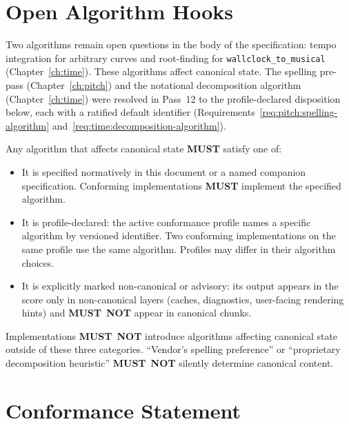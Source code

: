 \documentclass[11pt,letterpaper]{report}
\newcounter{requirement}[chapter]
\newcommand{\MUST}{\textbf{MUST}}
\newcommand{\MUSTNOT}{\textbf{MUST}\nobreak\ \textbf{NOT}}
\begin{document}
\section{Open Algorithm Hooks}
\label{sec:det:open}

Two algorithms remain open questions in the body of the
specification: tempo integration for arbitrary curves
and root-finding for \texttt{wallclock\_to\_musical}
(Chapter~\ref{ch:time}). These algorithms affect canonical
state. The spelling pre-pass (Chapter~\ref{ch:pitch}) and the
notational decomposition algorithm (Chapter~\ref{ch:time})
were resolved in Pass~12 to the profile-declared disposition
below, each with a ratified default identifier
(Requirements~\ref{req:pitch:spelling-algorithm}
and~\ref{req:time:decomposition-algorithm}).

\begin{requirement}
  \label{req:determinism:canonical-algorithm-registration}
  Any algorithm that affects canonical state \MUST{} satisfy one
  of:

  \begin{itemize}
    \item It is specified normatively in this document or a
      named companion specification. Conforming implementations
      \MUST{} implement the specified algorithm.
    \item It is profile-declared: the active conformance profile
      names a specific algorithm by versioned identifier. Two
      conforming implementations on the same profile use the
      same algorithm. Profiles may differ in their algorithm
      choices.
    \item It is explicitly marked non-canonical or advisory: its
      output appears in the score only in non-canonical layers
      (caches, diagnostics, user-facing rendering hints) and
      \MUSTNOT{} appear in canonical chunks.
  \end{itemize}

  Implementations \MUSTNOT{} introduce algorithms affecting
  canonical state outside of these three categories. ``Vendor's
  spelling preference'' or ``proprietary decomposition heuristic''
  \MUSTNOT{} silently determine canonical content.
\end{requirement}

\section{Conformance Statement}
\label{sec:det:conformance}
\end{document}
